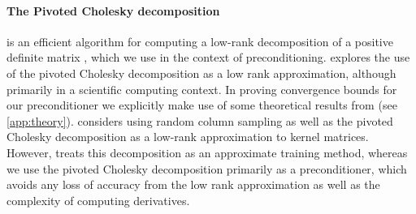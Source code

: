 \paragraph{The Pivoted Cholesky decomposition}
is an efficient algorithm for computing a low-rank decomposition of a positive definite matrix \cite{harbrecht2012low,bach2013sharp}, which we use in the context of preconditioning.
\citet{harbrecht2012low} explores the use of the pivoted Cholesky decomposition as a low rank approximation, although primarily in a scientific computing context.
In proving convergence bounds for our preconditioner we explicitly make use of some theoretical results from \cite{harbrecht2012low} (see \autoref{app:theory}).
\citet{bach2013sharp} considers using random column sampling as well as the pivoted Cholesky decomposition as a low-rank approximation to kernel matrices.
However, \citet{bach2013sharp} treats this decomposition as an approximate training method, whereas we use the pivoted Cholesky decomposition primarily
as a preconditioner, which avoids any loss of accuracy from the low rank approximation as well as the complexity of computing derivatives.
